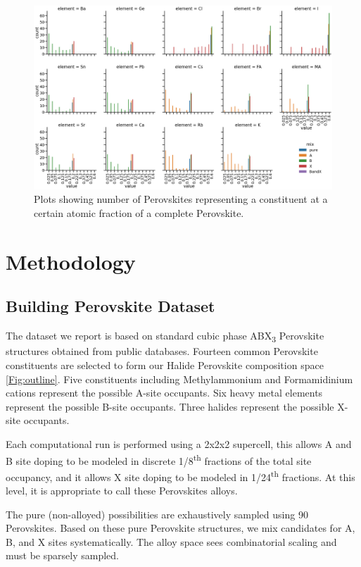 \documentclass[twoside, twocolumn, 9pt, draft]{article}
\begin{document}
\begin{figure}
\centering
\includegraphics[width=.9\linewidth]{variability_of_composition_vectors.png}
\caption{\label{fig:chemspace_uni} Plots showing number of Perovskites representing a constituent at a certain atomic fraction of a complete Perovskite.}
\end{figure}

\section*{Methodology}
\label{sec:org9c7faa5}
\subsection*{Building Perovskite Dataset}
\label{sec:orgd191b18}
The dataset we report is based on standard cubic phase ABX\textsubscript{3}
Perovskite structures obtained from public databases. Fourteen common
Perovskite constituents are selected to form our Halide Perovskite
composition space \ref{Fig:outline}. Five constituents including
Methylammonium and Formamidinium cations represent the possible A-site
occupants. Six heavy metal elements represent the possible B-site
occupants. Three halides represent the possible X-site occupants.

Each computational run is performed using a 2x2x2 supercell, this
allows A and B site doping to be modeled in discrete 1/8\textsuperscript{th} fractions
of the total site occupancy, and it allows X site doping to be modeled
in 1/24\textsuperscript{th} fractions. At this level, it is appropriate to call these
Perovskites alloys.

The pure (non-alloyed) possibilities are exhaustively sampled using 90
Perovskites. Based on these pure Perovskite structures, we mix
candidates for A, B, and X sites systematically. The alloy space sees
combinatorial scaling and must be sparsely sampled.
\end{document}
